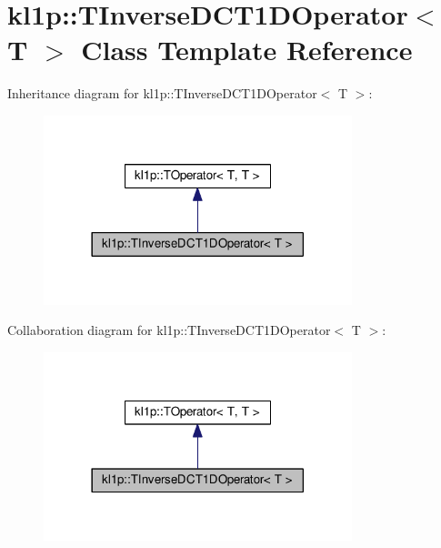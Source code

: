 \hypertarget{classkl1p_1_1TInverseDCT1DOperator}{}\section{kl1p\+:\+:T\+Inverse\+D\+C\+T1\+D\+Operator$<$ T $>$ Class Template Reference}
\label{classkl1p_1_1TInverseDCT1DOperator}


Inheritance diagram for kl1p\+:\+:T\+Inverse\+D\+C\+T1\+D\+Operator$<$ T $>$\+:
\nopagebreak
\begin{figure}[H]
\begin{center}
\leavevmode
\includegraphics[width=254pt]{classkl1p_1_1TInverseDCT1DOperator__inherit__graph}
\end{center}
\end{figure}


Collaboration diagram for kl1p\+:\+:T\+Inverse\+D\+C\+T1\+D\+Operator$<$ T $>$\+:
\nopagebreak
\begin{figure}[H]
\begin{center}
\leavevmode
\includegraphics[width=254pt]{classkl1p_1_1TInverseDCT1DOperator__coll__graph}
\end{center}
\end{figure}
